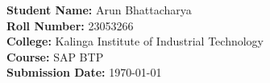 \documentclass[a4paper,12pt]{article}
\begin{document}
\vspace{8mm}
\begin{mdframed}[backgroundcolor=lightgray, roundcorner=4pt, linewidth=0pt, innertopmargin=8pt, innerbottommargin=8pt]
\textbf{Student Name:} Arun Bhattacharya\\
\textbf{Roll Number:} 23053266\\
\textbf{College:} Kalinga Institute of Industrial Technology\\
\textbf{Course:} SAP BTP\\
\textbf{Submission Date:} \today
\end{mdframed}
\end{document}
